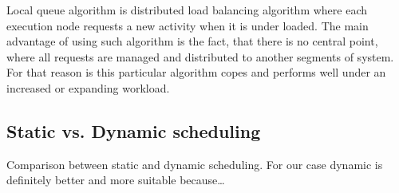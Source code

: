 Local queue algorithm is distributed load balancing algorithm where each execution node requests a new activity when it is under loaded.
The main advantage of using such algorithm is the fact, that there is no central point,
where all requests are managed and distributed to another segments of system.
For that reason is this particular algorithm copes and performs well under an increased or expanding workload.

\subsection{Static vs.
Dynamic scheduling}\label{subsec:static-vs.-dynamic-scheduling}
Comparison between static and dynamic scheduling.
For our case dynamic is definitely better and more suitable because\ldots